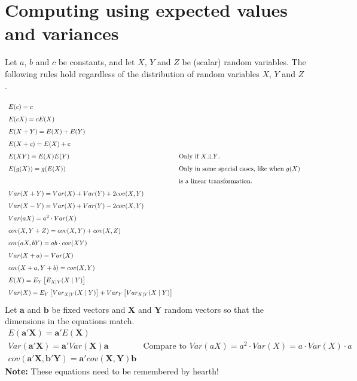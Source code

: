 \documentclass[10pt, twoside, a4paper]{book}
\newcommand{\indep}{\rotatebox[origin=c]{90}{$\models$}}
\theoremstyle{definition}
\begin{document}
\section{Computing using expected values and variances}
Let $a$, $b$ and $c$ be constants, and let $X$, $Y$ and $Z$ be (scalar) random
variables. The following rules hold regardless of the distribution of random
variables $X$, $Y$ and $Z$.

\begin{equation*}
\renewcommand{\arraystretch}{1.6}
\begin{array}{ll}

E(c) = c \\
E(cX) = cE(X) \\
E(X+Y) = E(X)+E(Y) \\
E(X + c) = E(X)+c \\
E(XY) = E(X)E(Y) & \text{Only if $X \indep Y$.} \\
E(g(X)) = g(E(X)) & \text{Only in some special cases, like when $g(X)$ }\\
&\text{is a linear transformation.} \\
Var(X+Y) = Var(X)+Var(Y)+2cov(X,Y) \\
Var(X-Y) = Var(X)+Var(Y)-2cov(X,Y) \\
Var(aX) = a^2 \cdot Var(X) \\
cov(X, Y+Z) = cov(X,Y)+cov(X,Z) \\
cov(aX,bY) = ab\cdot cov(XY) \\
Var(X+a) = Var(X) \\
cov(X+a,Y+b) = cov(X,Y) \\
E(X) = E_Y\left[E_{X\mid Y}(X \mid Y)\right] \\
Var(X) = E_Y\left[Var_{X\mid Y}(X \mid Y)\right]+Var_Y\left[Var_{X\mid Y}(X \mid
Y)\right]
\end{array}
\end{equation*}
Let $\bm a$ and $\bm b$ be fixed vectors and $\bm X$ and $\bm Y$ random vectors
so that the dimensions in the equations match.
\begin{equation*}
\renewcommand{\arraystretch}{1.6}
\begin{array}{ll}
E(\bm a' \bm X) = \bm a' E(\bm X) \\
Var(\bm a' \bm X) = \bm a' Var(\bm X) \bm a & \text{Compare to }Var(aX) = a^2
\cdot Var(X) = a \cdot Var(X) \cdot a \\
cov(\bm a' \bm X, \bm b' \bm Y) = \bm a' cov(\bm X, \bm Y) \bm b
\end{array}
\end{equation*}
{\bf Note: } These equations need to be remembered by hearth!
\end{document}
